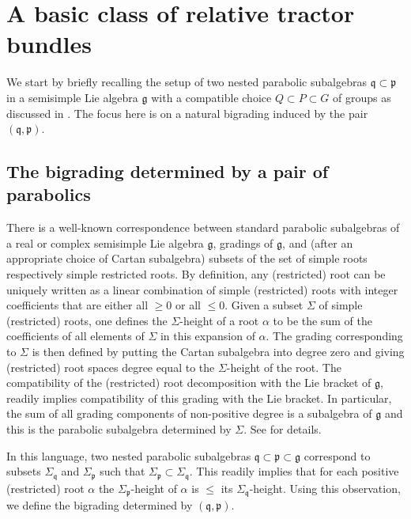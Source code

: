 \documentclass[pdftex]{sigma}
\numberwithin{equation}{section}
\def\frak{\mathfrak}
\newcommand{\al}{\alpha}
\newcommand{\Si}{\Sigma}
\begin{document}
\section{A basic class of relative tractor bundles}\label{2}

We start by briefly recalling the setup of two nested parabolic subalgebras $\frak
q\subset\frak p$ in a semisimple Lie algebra $\frak g$ with a compatible choice
$Q\subset P\subset G$ of groups as discussed in \cite{Rel-BGG1}. The focus here is on
a natural bigrading induced by the pair $(\frak q,\frak p)$.

\subsection{The bigrading determined by a pair of parabolics}\label{2.1}
There is a well-known correspondence between standard parabolic subalgebras of a real
or complex semisimple Lie algebra $\frak g$, gradings of $\frak g$, and (after an
appropriate choice of Cartan subalgebra) subsets of the set of simple roots
respectively simple restricted roots. By definition, any (restricted) root can be
uniquely written as a linear combination of simple (restricted) roots with integer
coefficients that are either all $\geq 0$ or all $\leq 0$. Given a subset $\Si$ of
simple (restricted) roots, one defines the $\Si$-height of a root $\al$ to be the sum
of the coefficients of all elements of $\Si$ in this expansion of $\al$. The grading
corresponding to $\Si$ is then defined by putting the Cartan subalgebra into degree
zero and giving (restricted) root spaces degree equal to the $\Si$-height of the
root. The compatibility of the (restricted) root decomposition with the Lie bracket
of $\frak g$, readily implies compatibility of this grading with the Lie bracket. In
particular, the sum of all grading components of non-positive degree is a subalgebra
of $\frak g$ and this is the parabolic subalgebra determined by $\Si$. See \cite[Sections
3.2.1 and 3.2.9]{book} for details.

In this language, two nested parabolic subalgebras $\frak q\subset\frak p\subset\frak
g$ correspond to subsets $\Si_{\frak q}$ and $\Si_{\frak p}$ such that $\Si_{\frak
 p}\subset\Si_{\frak q}$. This readily implies that for each positive (restricted)
root $\al$ the $\Si_{\frak p}$-height of $\al$ is $\leq$ its $\Si_{\frak
 q}$-height. Using this observation, we define the bigrading determined by $(\frak
q,\frak p)$.
\end{document}
